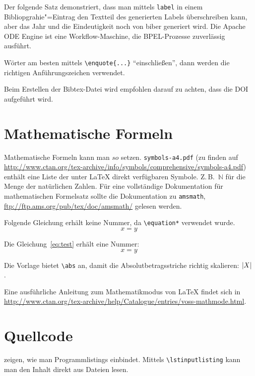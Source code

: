 Der folgende Satz demonstriert, dass man mittels \texttt{label} in einem Bibliopgrahie"=Eintrag den Textteil des generierten Labels überschreiben kann, aber das Jahr und die Eindeutigkeit noch von biber generiert wird.
Die Apache ODE Engine \cite{ApacheODE} ist eine Workflow-Maschine, die BPEL-Prozesse zuverlässig ausführt.

Wörter am besten mittels \texttt{\textbackslash enquote\{...\}} \enquote{einschließen}, dann werden die richtigen Anführungszeichen verwendet.

Beim Erstellen der Bibtex-Datei wird empfohlen darauf zu achten, dass die DOI aufgeführt wird.

\section{Mathematische Formeln}
\label{sec:mf}
Mathematische Formeln kann man $so$ setzen. \texttt{symbols-a4.pdf} (zu finden auf \url{http://www.ctan.org/tex-archive/info/symbols/comprehensive/symbols-a4.pdf}) enthält eine Liste der unter LaTeX direkt verfügbaren Symbole.
Z.\,B.\ $\mathbb{N}$ für die Menge der natürlichen Zahlen.
Für eine vollständige Dokumentation für mathematischen Formelsatz sollte die Dokumentation zu \texttt{amsmath}, \url{ftp://ftp.ams.org/pub/tex/doc/amsmath/} gelesen werden.

Folgende Gleichung erhält keine Nummer, da \texttt{\textbackslash equation*} verwendet wurde.
\begin{equation*}
  x = y
\end{equation*}

Die Gleichung~\ref{eq:test} erhält eine Nummer:
\begin{equation}
  \label{eq:test}
  x = y
\end{equation}

Die Vorlage bietet \verb+\abs+ an, damit die Absolutbetragsstriche richtig skalieren:
$\left\lvert X\right\rvert$.

Eine ausführliche Anleitung zum Mathematikmodus von LaTeX findet sich in \url{http://www.ctan.org/tex-archive/help/Catalogue/entries/voss-mathmode.html}.

\section{Quellcode}
 zeigen, wie man Programmlistings einbindet.
Mittels \texttt{\textbackslash lstinputlisting} kann man den Inhalt direkt aus Dateien lesen.

